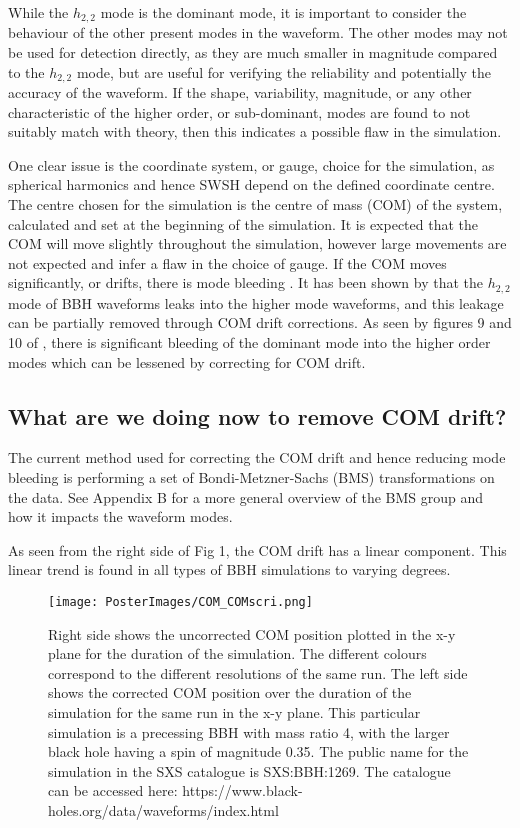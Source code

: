 \documentclass{article}
\begin{document}
While the $h_{2,2}$ mode is the dominant mode, it is important to consider the behaviour of the other present modes in the waveform. The other modes may not be used for detection directly, as they are much smaller in magnitude compared to the $h_{2,2}$ mode, but are useful for verifying the reliability and potentially the accuracy of the waveform. If the shape, variability, magnitude, or any other characteristic of the higher order, or sub-dominant, modes are found to not suitably match with theory, then this indicates a possible flaw in the simulation.

One clear issue is the coordinate system, or gauge, choice for the simulation, as spherical harmonics and hence SWSH depend on the defined coordinate centre. The centre chosen for the simulation is the centre of mass (COM) of the system, calculated and set at the beginning of the simulation. It is expected that the COM will move slightly throughout the simulation, however large movements are not expected and infer a flaw in the choice of gauge. If the COM moves significantly, or drifts, there is mode bleeding \cite{MB16}. It has been shown by \cite{MB16} that the $h_{2,2}$ mode of BBH waveforms leaks into the higher mode waveforms, and this leakage can be partially removed through COM drift corrections. As seen by figures 9 and 10 of \cite{MB16}, there is significant bleeding of the dominant mode into the higher order modes which can be lessened by correcting for COM drift.


\subsection{What are we doing now to remove COM drift?}
The current method used for correcting the COM drift and hence reducing mode bleeding is performing a set of Bondi-Metzner-Sachs (BMS) transformations on the data. See Appendix B for a more general overview of the BMS group and how it impacts the waveform modes.

As seen from the right side of Fig 1, the COM drift has a linear component. This linear trend is found in all types of BBH simulations to varying degrees.
\begin{figure}
	\texttt{[image: PosterImages/COM\_COMscri.png]}
	\caption{Right side shows the uncorrected COM position plotted in the x-y plane for the duration of the simulation. The different colours correspond to the different resolutions of the same run. The left side shows the corrected COM position over the duration of the simulation for the same run in the x-y plane. This particular simulation is a precessing BBH with mass ratio 4, with the larger black hole having a spin of magnitude 0.35. The public name for the simulation in the SXS catalogue is SXS:BBH:1269. The catalogue can be accessed here: https://www.black-holes.org/data/waveforms/index.html}
\end{figure}
\end{document}
